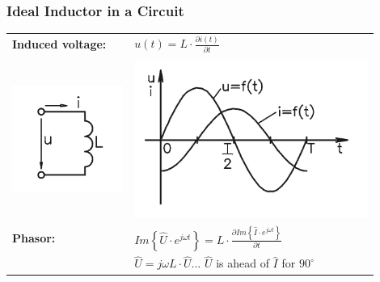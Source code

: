 \documentclass{beamer}
\begin{document}
	\begin{frame}
    \frametitle{Ideal Inductor in a Circuit}
		\begin{center}
		\begin{tabular}{m{0.3\linewidth} m{0.6\linewidth}}
			\textbf{Induced voltage:} 	& $u\left(t\right)= L\cdot \frac{\partial i\left(t\right)}{\partial t}$\\\\
			\includegraphics[scale=0.4]{obr09_obvodCiv.png}	& \includegraphics[scale=0.5]{obr10_obvodCivGraf.png}\\
			\textbf{Phasor:}						& $Im\left\{\hat{U}\cdot e^{j\omega t}\right\} = L\cdot \frac{\partial Im\left\{\hat{I}\cdot e^{j\omega t}\right\}}{\partial t}$\\
																	& $\hat{U} = j\omega L \cdot \hat{U}$... $\hat{U}$ is ahead of $\hat{I}$ for $90^\circ$
		\end{tabular}
		\end{center}
  \end{frame}
\end{document}
